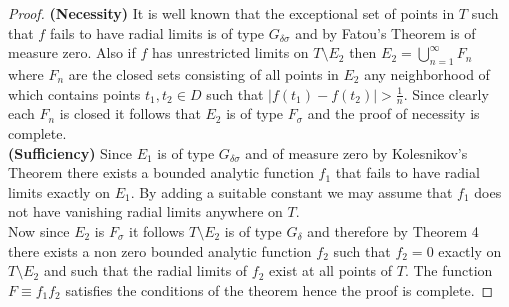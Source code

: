 \documentclass[10pt,a4paper]{amsart}
\begin{document}
\begin{proof}
\textbf{(Necessity)} It is well known that the exceptional set of points in $T$ such that $f$ fails to have radial
 limits is of type $G_{\delta\sigma}$ and by {Fatou's Theorem} is of measure zero. 
 Also if $f$ has unrestricted limits on $T\setminus E_2$ then $E_2=\bigcup_{n=1}^{\infty} F_n$ where $F_n$ are the closed sets consisting 
 of all points in $E_2$ any neighborhood of which contains points $t_1,t_2\in D$ such that $|f(t_1)-f(t_2)|>\frac{1}{n}$. Since clearly each $F_n$ is closed it follows that $E_2$ is of type $F_{\sigma}$ and the proof of necessity is complete.\\
\textbf{(Sufficiency)} Since $E_1$ is of type $G_{\delta\sigma}$ and of measure zero by {Kolesnikov's Theorem} there exists a bounded analytic function $f_1$ that fails to have radial limits exactly on $E_1$. By adding a suitable constant we may assume that $f_1$ does not have vanishing radial limits anywhere on $T$.\\
 Now since $E_2$ is $F_\sigma$ it follows $T\setminus E_2$ is of type $G_\delta$ and therefore by {Theorem 4} there exists a non zero bounded analytic function $f_2$ such that $f_2=0$ exactly on $T\setminus E_2$ and such that the radial limits of $f_2$ exist at all points of $T$.
The function $F\equiv f_1f_2$ satisfies the conditions of the theorem hence the proof is complete. 
\end{proof}
\end{document}

